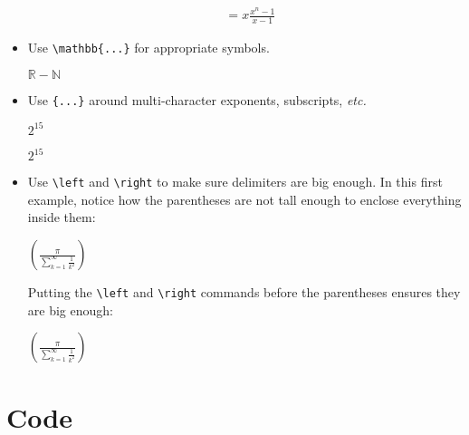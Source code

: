 \documentclass{article}
\begin{document}
\begin{itemize}
\begin{good}
\begin{align*}
     &= x \frac{x^n - 1}{x - 1}
\end{align*}
  \end{good}
\item Use \verb|\mathbb{...}| for appropriate symbols.
  \begin{good}
$\mathbb{R} - \mathbb{N}$
  \end{good}
\item Use \verb|{...}| around multi-character exponents, subscripts,
  \emph{etc.}
  \begin{bad}
$2^15$
  \end{bad}
  \begin{good}
$2^{15}$
  \end{good}
\item Use \verb|\left| and \verb|\right| to make sure delimiters are
  big enough.  In this first example, notice how the parentheses are
  not tall enough to enclose everything inside them:
  \begin{bad}
$(\frac{\pi}{\sum_{k=1}^{\infty} \frac{1}{k^2}})$
  \end{bad}
  Putting the \verb|\left| and \verb|\right| commands before the
  parentheses ensures they are big enough:
  \begin{good}
$\left( \frac{\pi}{\sum_{k=1}^{\infty} \frac{1}{k^2}} \right)$
  \end{good}
\end{itemize}

\section*{Code}
\end{document}
